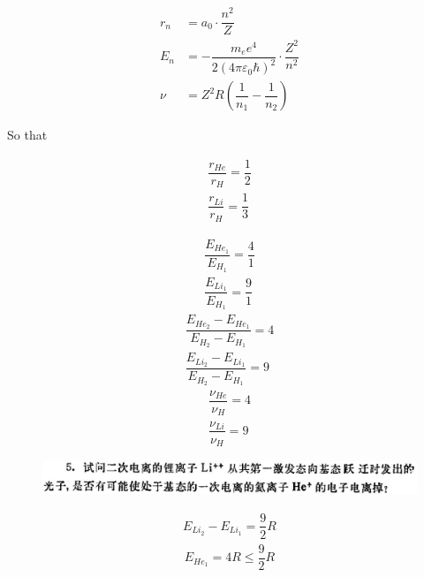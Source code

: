 \documentclass{article}
\begin{document}
\begin{equation*}
  \begin{aligned}
    r_n &= a_0 \cdot \dfrac{n^2}{Z} \\
    E_n &= - \dfrac{m_e e^4}{2 \left( 4 \pi \varepsilon_0 \hbar \right)^2} \cdot \dfrac{Z^2}{n^2}  \\
    \nu &= Z^2 R \left( \dfrac{1}{n_1} - \dfrac{1}{n_2}   \right)
  \end{aligned}
\end{equation*}

So that

\begin{equation*}
  \begin{aligned}
    \dfrac{r_{He}}{r_H} = \dfrac{1}{2} \\
    \dfrac{r_{Li}}{r_H} = \dfrac{1}{3}  
  \end{aligned}
\end{equation*}

\begin{equation*}
  \begin{aligned}
    \dfrac{E_{He}_1}{E_H_1} = \dfrac{4}{1} \\
    \dfrac{E_{Li}_1}{E_H_1} = \dfrac{9}{1}  
  \end{aligned}
\end{equation*}
\begin{equation*}
  \begin{aligned}
    \dfrac{E_{He}_2 - E_{He}_1}{E_H_2 - E_H_1} = 4 \\
    \dfrac{E_{Li}_2 - E_{Li}_1}{E_H_2 - E_H_1} = 9 
  \end{aligned}
\end{equation*}
\begin{equation*}
  \begin{aligned}
    \dfrac{\nu_{He}}{\nu_H} = 4 \\
    \dfrac{\nu_{Li}}{\nu_H} = 9 
  \end{aligned}
\end{equation*}

\begin{figure}[H]
  \centering
  \includegraphics[width=\linewidth]{figures/Problem5}
  \label{fig:}
\end{figure}

\begin{equation*}
  \begin{aligned}
    E_{Li}_2 - E_{Li}_1 = \dfrac{9}{2} R
  \end{aligned}
\end{equation*}
\begin{equation*}
  \begin{aligned}
    E_{He}_1 = 4 R \leq \dfrac{9}{2} R 
  \end{aligned}
\end{equation*}
\end{document}

